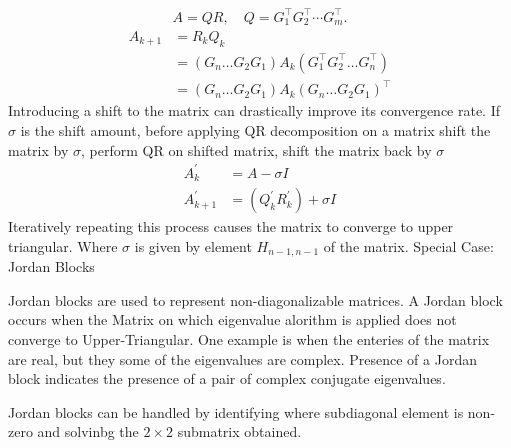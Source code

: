 \documentclass[journal]{IEEEtran}
\begin{document}
\begin{align}
A = Q R, \quad Q = G_1^{\top} G_2^{\top} \cdots G_m^{\top}.
\end{align}
\begin{align}
    A_{k+1}&= R_k Q_k\\
    &=(G_n \dots G_2 G_1)A_k(G_1^{\top}G_2^{\top}\dots G_n^{\top})\\
    &= (G_n \dots G_2 G_1)A_k(G_n \dots G_2 G_1)^{\top}
\end{align}
Introducing a shift to the matrix can drastically improve its convergence rate. If $\sigma$ is the shift amount, before applying QR decomposition on a matrix shift the matrix by $\sigma$, perform QR on shifted matrix, shift the matrix back by $\sigma$
\begin{align}
    A^{\prime}_k &= A-\sigma I\\
    A^{\prime}_{k+1} &= (Q_k^{\prime}R_k^{\prime})+\sigma I
\end{align}
Iteratively repeating this process causes the matrix to converge to upper triangular.
Where $\sigma$ is given by element $H_{n-1, n-1} $ of the matrix. \newline
Special Case: Jordan Blocks \newline

Jordan blocks are used to represent non-diagonalizable matrices. A Jordan block occurs when the Matrix on which eigenvalue alorithm is applied does not converge to Upper-Triangular. One example is when the enteries of the matrix are real, but they some of the eigenvalues are complex. Presence of a Jordan block indicates the presence of a pair of complex conjugate eigenvalues. 
\begin{center}
\end{center}
Jordan blocks can be handled by identifying where subdiagonal element is non-zero and solvinbg the $2 \times 2$ submatrix obtained.
\end{document}
